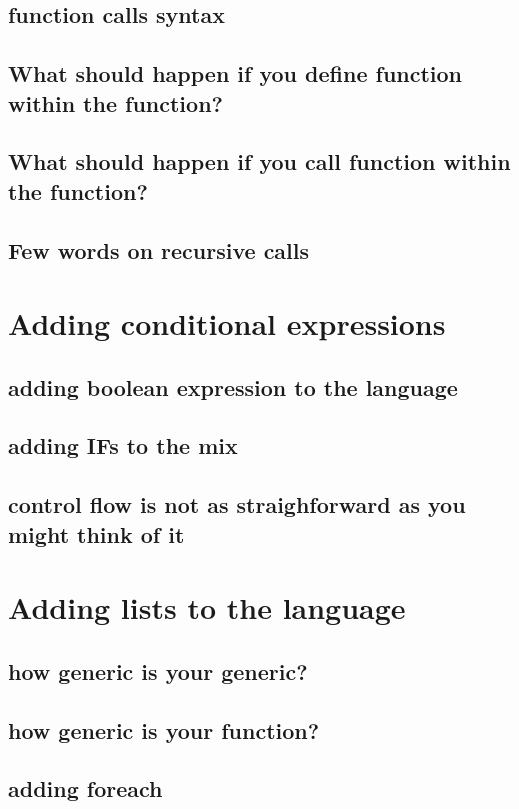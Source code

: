 \documentclass[11pt]{article}
\begin{document}
\subsection{function calls syntax}
\label{sec:orgea17b80}
\subsection{What should happen if you define function within the function?}
\label{sec:org18da690}
\subsection{What should happen if you call function within the function?}
\label{sec:orga9788d1}
\subsection{Few words on recursive calls}
\label{sec:org8c767d1}
\section{Adding conditional expressions}
\label{sec:org39d600f}
\subsection{adding boolean expression to the language}
\label{sec:org1bb2b00}
\subsection{adding IFs to the mix}
\label{sec:org34b44bc}
\subsection{control flow is not as straighforward as you might think of it}
\label{sec:orgb91adf3}
\section{Adding lists to the language}
\label{sec:org81838ba}
\subsection{how generic is your generic?}
\label{sec:org3d21913}
\subsection{how generic is your function?}
\label{sec:orgc0cbea7}
\subsection{adding foreach}
\label{sec:org9dac83d}
\end{document}
